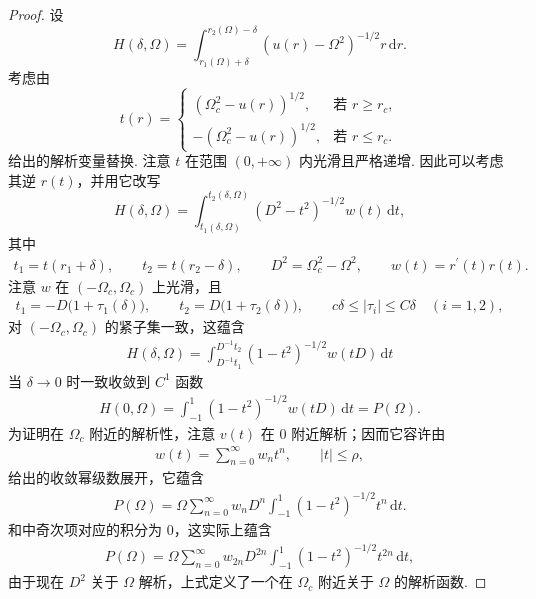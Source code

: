 \begin{proof}
设
\begin{equation}\label{eq:9.28}
  H(\delta,\Omega)=\int_{r_{1}(\Omega)+\delta}^{r_{2}(\Omega)-\delta}(u(r)-\Omega^{2})^{-1/2}r\,\mathrm{d}r.
\end{equation}
考虑由
\begin{equation}\label{eq:9.29}
  t(r)=\begin{cases}
    (\Omega_{c}^{2}-u(r))^{1/2}, & \text{若 } r\geq r_{c},\\
    -(\Omega_{c}^{2}-u(r))^{1/2}, & \text{若 } r\leq r_{c}.
  \end{cases}
\end{equation}
给出的解析变量替换. 注意 $t$ 在范围 $(0,+\infty)$ 内光滑且严格递增. 因此可以考虑其逆 $r(t)$，并用它改写
\begin{equation}\label{eq:9.30}
  H(\delta,\Omega)=\int_{t_{1}(\delta,\Omega)}^{t_{2}(\delta,\Omega)}(D^{2}-t^{2})^{-1/2}w(t)\,\mathrm{d}t,
\end{equation}
其中
\begin{align*}
  t_{1}=t(r_{1}+\delta),\qquad t_{2}=t(r_{2}-\delta),\qquad
  D^{2}=\Omega_{c}^{2}-\Omega^{2},\qquad w(t)=r^{\prime}(t)r(t).
\end{align*}
注意 $w$ 在 $(-\Omega_{c}, \Omega_{c})$ 上光滑，且
\begin{align*}
  t_{1}=-D\bigl(1+\tau_{1}(\delta)\bigr),\qquad
  t_{2}=D\bigl(1+\tau_{2}(\delta)\bigr),\qquad
  c\delta\leq|\tau_{i}|\leq C\delta\quad (i=1,2),
\end{align*}
对 $(-\Omega_c, \Omega_c)$ 的紧子集一致，这蕴含
\begin{align*}
  H(\delta,\Omega)=\int_{D^{-1}t_{1}}^{D^{-1}t_{2}}(1-t^{2})^{-1/2}w(tD)\,\mathrm{d}t
\end{align*}
当 $\delta \to 0$ 时一致收敛到 $C^1$ 函数
\begin{align*}
  H(0,\Omega)=\int_{-1}^{1}(1-t^{2})^{-1/2}w(tD)\,\mathrm{d}t=P(\Omega).
\end{align*}
为证明在 $\Omega_c$ 附近的解析性，注意 $v(t)$ 在 $0$ 附近解析；因而它容许由
\begin{align*}
  w(t)=\sum_{n=0}^{\infty}w_{n}t^{n},\qquad |t|\leq\rho,
\end{align*}
给出的收敛幂级数展开，它蕴含
\begin{align*}
  P(\Omega)=\Omega\sum_{n=0}^{\infty}w_{n}D^{n}\int_{-1}^{1}(1-t^{2})^{-1/2}t^{n}\,\mathrm{d}t.
\end{align*}
和中奇次项对应的积分为 $0$，这实际上蕴含
\begin{align*}
  P(\Omega)=\Omega\sum_{n=0}^{\infty}w_{2n}D^{2n}\int_{-1}^{1}(1-t^{2})^{-1/2}t^{2n}\,\mathrm{d}t,
\end{align*}
由于现在 $D^2$ 关于 $\Omega$ 解析，上式定义了一个在 $\Omega_c$ 附近关于 $\Omega$ 的解析函数.
\end{proof}

